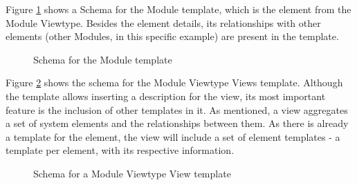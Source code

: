 Figure \ref{figure:moduleTemplate} shows a Schema for the Module template, which is the element from the Module Viewtype. Besides the element details, its relationships with other elements (other Modules, in this specific example) are present in the template.

\begin{figure}[h]
\centering

\caption{Schema for the Module template}
\label{figure:moduleTemplate}
\end{figure}

Figure \ref{figure:viewTemplate} shows the schema for the Module Viewtype Views template. Although the template allows inserting a description for the view, its most important feature is the inclusion of other templates in it. As mentioned, a view aggregates a set of system elements and the relationships between them. As there is already a template for the element, the view will include a set of element templates - a template per element, with its respective information.

\begin{figure}[h]
\centering

\caption{Schema for a Module Viewtype View template}
\label{figure:viewTemplate}
\end{figure}

